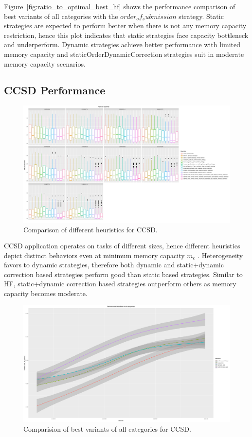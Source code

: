 \documentclass[runningheads]{llncs} %
\begin{document}
 
Figure~\ref{fig:ratio_to_optimal_best_hf} shows the performance comparison of best variants of all categories with the $order_of_submission$ strategy. Static strategies are expected to perform better when there is not any memory capacity restriction, hence this plot indicates that static strategies face capacity bottleneck and underperform. Dynamic strategies achieve better performance with limited memory capacity and staticOrderDynamicCorrection  strategies suit in moderate memory capacity scenarios.

\subsection{CCSD Performance}

	\begin{figure}[htb]
	\includegraphics[scale=0.3]{../ExperimentalResults/ratio_to_optimal_ccsd.pdf}
	\caption{Comparison of different heuristics for CCSD.}
	\label{fig:ratio_to_optimal_ccsd}
	\end{figure}	

CCSD application operates on tasks of different sizes, hence different heuristics depict distinct behaviors even at minimum memory capacity $m_c$ . Heterogeneity favors to dynamic strategies, therefore both dynamic and static+dynamic correction based strategies perform good than  static based strategies. Similar to HF,  static+dynamic correction based strategies outperform others as memory capacity becomes moderate. 


	\begin{figure}[htb]
	\includegraphics[scale=0.25]{../ExperimentalResults/inverse_ratio_to_optimal_ccsd-best.pdf}
	\caption{Comparision of best variants of all categories for CCSD.}
	\label{fig:ratio_to_optimal_best_ccsd}
	\end{figure}
\end{document}
